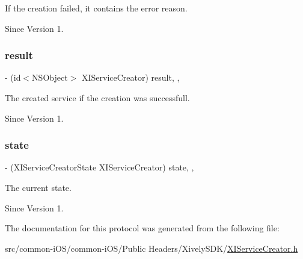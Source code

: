 If the creation failed, it contains the error reason. 

\begin{DoxySince}{Since}
Version 1. 
\end{DoxySince}
\hypertarget{protocol_x_i_service_creator_01-p_a02cfe3158566e5cd227cd5113f17225c}{}\label{protocol_x_i_service_creator_01-p_a02cfe3158566e5cd227cd5113f17225c} 
\subsubsection{\texorpdfstring{result}{result}}
{\footnotesize\ttfamily -\/ (id$<$N\+S\+Object$>$ X\+I\+Service\+Creator) result\hspace{0.3cm}{\ttfamily [read]}, {\ttfamily [nonatomic]}, {\ttfamily [assign]}}



The created service if the creation was successfull. 

\begin{DoxySince}{Since}
Version 1. 
\end{DoxySince}
\hypertarget{protocol_x_i_service_creator_01-p_ab07d33a31807e2a14a192b2d0245b49d}{}\label{protocol_x_i_service_creator_01-p_ab07d33a31807e2a14a192b2d0245b49d} 
\subsubsection{\texorpdfstring{state}{state}}
{\footnotesize\ttfamily -\/ (X\+I\+Service\+Creator\+State X\+I\+Service\+Creator) state\hspace{0.3cm}{\ttfamily [read]}, {\ttfamily [nonatomic]}, {\ttfamily [assign]}}



The current state. 

\begin{DoxySince}{Since}
Version 1. 
\end{DoxySince}


The documentation for this protocol was generated from the following file\+:\begin{DoxyCompactItemize}
\item 
src/common-\/i\+O\+S/common-\/i\+O\+S/\+Public Headers/\+Xively\+S\+D\+K/\hyperlink{_x_i_service_creator_8h}{X\+I\+Service\+Creator.\+h}\end{DoxyCompactItemize}
